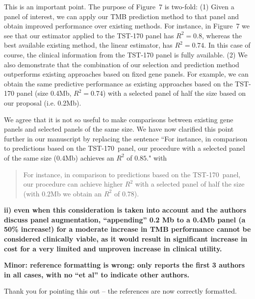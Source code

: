 \documentclass[12pt]{article}
\begin{document}
This is an important point. The purpose of Figure~7 is two-fold: (1) Given a panel of interest, we can apply our TMB prediction method to that panel and obtain improved performance over existing methods. For instance, in Figure~7 we see that our estimator applied to the TST-170 panel has $R^2 = 0.8$, whereas the best available existing method, the linear estimator, has $R^2 = 0.74$. In this case of course, the clinical information from the TST-170 panel is fully available. (2) We also demonstrate that the combination of our selection and prediction method outperforms existing approaches based on fixed gene panels. For example, we can obtain the same predictive performance as existing approaches based on the TST-170 panel (size 0.4Mb, $R^2 = 0.74$) with a selected panel of half the size based on our proposal (i.e. 0.2Mb). 

We agree that it is not so useful to make comparisons between existing gene panels and selected panels of the same size.  We have now clarified this point further in our manuscript by replacing the sentence ``For instance, in comparison to predictions based on the TST-170~panel, our procedure with a selected panel of the same size (0.4Mb) achieves an $R^2$ of $0.85$." with 
\begin{quotation} 
For instance, in comparison to predictions based on the TST-170~panel, our procedure can achieve higher $R^2$ with a selected panel of half the size (with $0.2$Mb we obtain an $R^2$ of $0.78$).
\end{quotation} 

\textbf{ii) even when this consideration is taken into account and the authors discuss panel augmentation, “appending” 0.2 Mb to a 0.4Mb panel (a 50\% increase!) for a moderate increase in TMB performance cannot be considered clinically viable, as it would result in significant increase in cost for a very limited and unproven increase in clinical utility.}



\textbf{Minor: reference formatting is wrong: only reports the first 3 authors in all cases, with no “et al” to indicate other authors.}

Thank you for pointing this out -- the references are now correctly formatted. 
\end{document}
